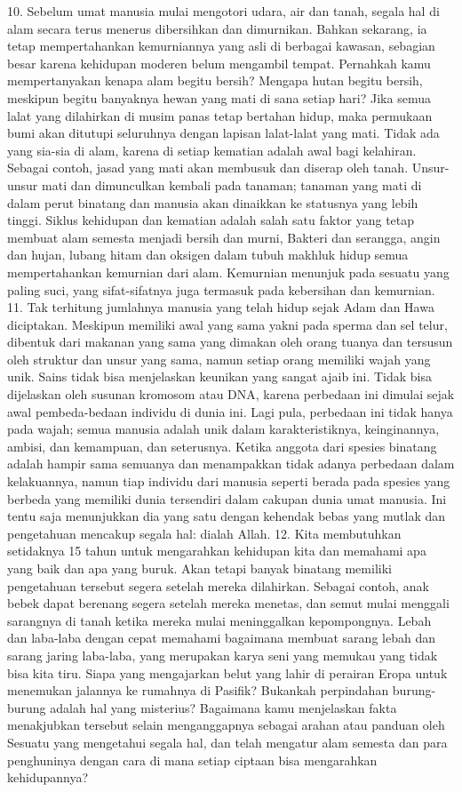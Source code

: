 \documentclass[]{article}
\begin{document}
10. Sebelum umat manusia mulai mengotori udara, air dan tanah, segala hal di alam secara terus menerus dibersihkan dan dimurnikan. Bahkan sekarang, ia tetap mempertahankan kemurniannya yang asli di berbagai kawasan, sebagian besar karena kehidupan moderen belum mengambil tempat. Pernahkah kamu mempertanyakan kenapa alam begitu bersih? Mengapa  hutan begitu bersih, meskipun begitu banyaknya hewan yang mati di sana setiap hari? Jika semua lalat yang dilahirkan di musim panas tetap bertahan hidup,  maka permukaan bumi akan ditutupi seluruhnya dengan lapisan lalat-lalat yang mati. Tidak ada yang sia-sia di alam, karena di setiap kematian adalah awal bagi kelahiran. Sebagai contoh, jasad yang mati akan membusuk dan diserap oleh tanah. Unsur-unsur mati dan dimunculkan kembali pada tanaman; tanaman yang mati di dalam perut binatang dan manusia akan dinaikkan ke statusnya yang lebih  tinggi. Siklus kehidupan dan kematian adalah salah satu faktor yang tetap membuat alam semesta menjadi bersih dan murni, Bakteri dan serangga, angin dan hujan, lubang hitam dan oksigen dalam tubuh makhluk hidup semua mempertahankan kemurnian dari alam.  Kemurnian menunjuk pada sesuatu yang paling suci, yang sifat-sifatnya juga termasuk pada kebersihan dan kemurnian.
11. Tak terhitung jumlahnya manusia yang telah hidup sejak Adam dan Hawa diciptakan. Meskipun memiliki awal yang sama yakni pada sperma dan sel telur, dibentuk dari makanan yang sama yang dimakan oleh orang tuanya dan tersusun oleh struktur dan unsur yang sama, namun setiap orang memiliki wajah yang unik. Sains tidak bisa menjelaskan keunikan yang sangat ajaib ini. Tidak bisa dijelaskan oleh susunan kromosom atau DNA, karena perbedaan ini dimulai sejak awal pembeda-bedaan individu di dunia ini. Lagi pula, perbedaan ini tidak hanya pada wajah; semua manusia adalah unik dalam karakteristiknya, keinginannya, ambisi, dan kemampuan,  dan seterusnya. Ketika anggota dari spesies binatang adalah hampir sama semuanya dan menampakkan tidak adanya perbedaan dalam kelakuannya, namun tiap individu dari manusia seperti berada pada spesies yang berbeda yang memiliki dunia tersendiri dalam cakupan dunia umat manusia. Ini tentu saja menunjukkan dia yang satu dengan kehendak bebas yang mutlak dan pengetahuan mencakup segala hal: dialah Allah.
12. Kita membutuhkan setidaknya 15 tahun untuk mengarahkan kehidupan kita dan memahami apa yang baik dan apa yang buruk. Akan tetapi banyak binatang memiliki pengetahuan tersebut segera setelah mereka dilahirkan. Sebagai contoh, anak bebek dapat berenang segera setelah mereka menetas, dan semut mulai menggali sarangnya di tanah ketika mereka mulai meninggalkan  kepompongnya. Lebah dan laba-laba dengan cepat memahami bagaimana membuat sarang lebah dan sarang jaring laba-laba, yang merupakan karya seni yang memukau yang tidak bisa kita tiru. Siapa yang mengajarkan belut yang lahir di perairan Eropa untuk menemukan jalannya ke rumahnya di Pasifik? Bukankah perpindahan burung-burung adalah hal yang misterius? Bagaimana kamu menjelaskan fakta menakjubkan tersebut selain menganggapnya sebagai arahan atau panduan oleh Sesuatu yang mengetahui segala hal, dan telah mengatur alam semesta dan para penghuninya dengan cara di mana setiap ciptaan bisa mengarahkan kehidupannya?
\end{document}
